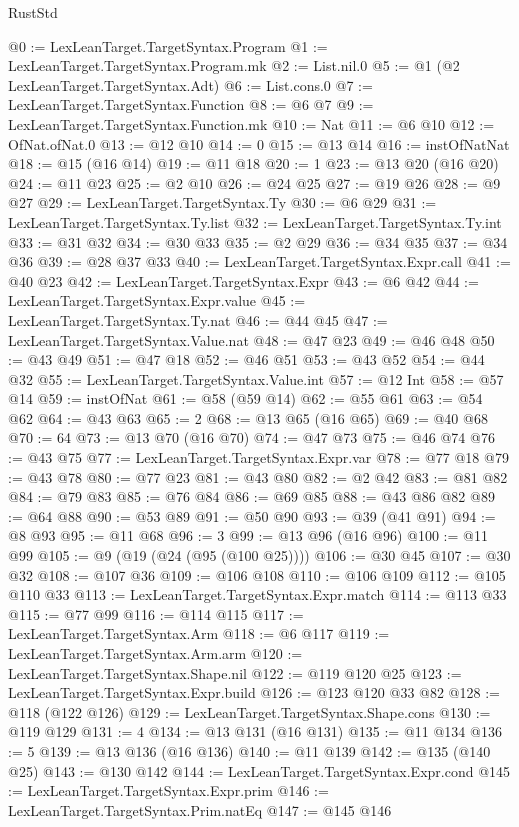 \begin{lexlean}{RustStd}
\begin{coremodule}
@0 := LexLeanTarget.TargetSyntax.Program
@1 := LexLeanTarget.TargetSyntax.Program.mk
@2 := List.nil.{0}
@5 := @1 (@2 LexLeanTarget.TargetSyntax.Adt)
@6 := List.cons.{0}
@7 := LexLeanTarget.TargetSyntax.Function
@8 := @6 @7
@9 := LexLeanTarget.TargetSyntax.Function.mk
@10 := Nat
@11 := @6 @10
@12 := OfNat.ofNat.{0}
@13 := @12 @10
@14 := 0
@15 := @13 @14
@16 := instOfNatNat
@18 := @15 (@16 @14)
@19 := @11 @18
@20 := 1
@23 := @13 @20 (@16 @20)
@24 := @11 @23
@25 := @2 @10
@26 := @24 @25
@27 := @19 @26
@28 := @9 @27
@29 := LexLeanTarget.TargetSyntax.Ty
@30 := @6 @29
@31 := LexLeanTarget.TargetSyntax.Ty.list
@32 := LexLeanTarget.TargetSyntax.Ty.int
@33 := @31 @32
@34 := @30 @33
@35 := @2 @29
@36 := @34 @35
@37 := @34 @36
@39 := @28 @37 @33
@40 := LexLeanTarget.TargetSyntax.Expr.call
@41 := @40 @23
@42 := LexLeanTarget.TargetSyntax.Expr
@43 := @6 @42
@44 := LexLeanTarget.TargetSyntax.Expr.value
@45 := LexLeanTarget.TargetSyntax.Ty.nat
@46 := @44 @45
@47 := LexLeanTarget.TargetSyntax.Value.nat
@48 := @47 @23
@49 := @46 @48
@50 := @43 @49
@51 := @47 @18
@52 := @46 @51
@53 := @43 @52
@54 := @44 @32
@55 := LexLeanTarget.TargetSyntax.Value.int
@57 := @12 Int
@58 := @57 @14
@59 := instOfNat
@61 := @58 (@59 @14)
@62 := @55 @61
@63 := @54 @62
@64 := @43 @63
@65 := 2
@68 := @13 @65 (@16 @65)
@69 := @40 @68
@70 := 64
@73 := @13 @70 (@16 @70)
@74 := @47 @73
@75 := @46 @74
@76 := @43 @75
@77 := LexLeanTarget.TargetSyntax.Expr.var
@78 := @77 @18
@79 := @43 @78
@80 := @77 @23
@81 := @43 @80
@82 := @2 @42
@83 := @81 @82
@84 := @79 @83
@85 := @76 @84
@86 := @69 @85
@88 := @43 @86 @82
@89 := @64 @88
@90 := @53 @89
@91 := @50 @90
@93 := @39 (@41 @91)
@94 := @8 @93
@95 := @11 @68
@96 := 3
@99 := @13 @96 (@16 @96)
@100 := @11 @99
@105 := @9 (@19 (@24 (@95 (@100 @25))))
@106 := @30 @45
@107 := @30 @32
@108 := @107 @36
@109 := @106 @108
@110 := @106 @109
@112 := @105 @110 @33
@113 := LexLeanTarget.TargetSyntax.Expr.match
@114 := @113 @33
@115 := @77 @99
@116 := @114 @115
@117 := LexLeanTarget.TargetSyntax.Arm
@118 := @6 @117
@119 := LexLeanTarget.TargetSyntax.Arm.arm
@120 := LexLeanTarget.TargetSyntax.Shape.nil
@122 := @119 @120 @25
@123 := LexLeanTarget.TargetSyntax.Expr.build
@126 := @123 @120 @33 @82
@128 := @118 (@122 @126)
@129 := LexLeanTarget.TargetSyntax.Shape.cons
@130 := @119 @129
@131 := 4
@134 := @13 @131 (@16 @131)
@135 := @11 @134
@136 := 5
@139 := @13 @136 (@16 @136)
@140 := @11 @139
@142 := @135 (@140 @25)
@143 := @130 @142
@144 := LexLeanTarget.TargetSyntax.Expr.cond
@145 := LexLeanTarget.TargetSyntax.Expr.prim
@146 := LexLeanTarget.TargetSyntax.Prim.natEq
@147 := @145 @146

\end{coremodule}
\end{lexlean}
